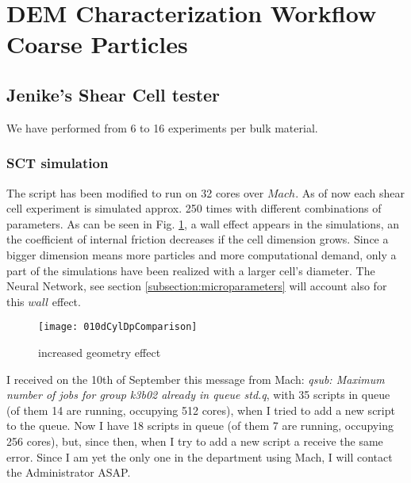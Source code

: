 
\section{DEM Characterization Workflow Coarse Particles}
\label{section:Demcharacterizationworkflowcoarseparticles}

\subsection{Jenike's  Shear Cell tester}
\label{subsection:jenikeshearcell}

We have performed from 6 to 16 experiments per bulk material.\\

\subsubsection{SCT simulation}
\label{subsubsection:sctsimulation}

The script has been modified to run on 32 cores over $Mach$. As of now each shear cell experiment is simulated approx. 250 times with different combinations of parameters.
As can be seen in Fig. \ref{010dCylDpComparison}, a wall effect appears in the simulations, an the coefficient of internal friction decreases if the cell dimension grows. Since a bigger dimension means more particles and more computational demand, only a part of the simulations have been realized with a larger cell's diameter. The Neural Network, see section \ref{subsection:microparameters} will account also for this $wall$ effect.\\
\begin{figure}[!h]
\texttt{[image: 010dCylDpComparison]}
\caption{increased geometry effect}
\label{010dCylDpComparison}
\end{figure}

I received on the 10th of September this message from Mach: \textit{qsub: Maximum number of jobs for group k3b02 already in queue std.q}, with 35 scripts in queue (of them 14 are running, occupying 512 cores), when I tried to add a new script to the queue.
Now I have 18 scripts in queue (of them 7 are running, occupying 256 cores), but, since then, when I try to add a new script a receive the same error.
Since I am yet the only one in the department using Mach, I will contact the Administrator ASAP.\\

